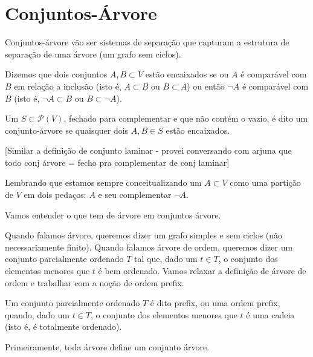 \documentclass[11pt]{article}
\theoremstyle{definition}
\theoremstyle{definition}
\theoremstyle{definition}
\theoremstyle{definition}
\theoremstyle{definition}
\theoremstyle{definition}
\theoremstyle{definition}
\theoremstyle{definition}
\newtheorem*{definition*}{Definição}
\newenvironment{definicao*}{
\definecolor{shadecolor}{HTML}{defcfc}
\begin{shaded}
\begin{definition*}
}
{
\end{definition*}
\end{shaded}
}
\theoremstyle{definition}
\theoremstyle{definition}
\theoremstyle{definition}
\theoremstyle{definition}
\theoremstyle{definition}
\theoremstyle{definition}
\begin{document}
\section{Conjuntos-Árvore}

Conjuntos-árvore vão ser sistemas de separação que capturam a estrutura de separação de uma árvore (um grafo sem ciclos).

\begin{definicao*}
  Dizemos que dois conjuntos $A,B \subset V$ estão encaixados se ou $A$ é comparável com $B$ em relação a inclusão (isto é, $A \subset B$ ou $B \subset A$) ou então $\lnot A$ é comparável com $B$ (isto é, $\lnot A \subset B$ ou $B \subset \lnot A$).

  Um $S \subset \mathcal{P}(V)$, fechado para complementar e que não contém o vazio, é dito um conjunto-árvore se quaisquer dois $A,B \in S$ estão encaixados.
\end{definicao*}

[Similar a definição de conjunto laminar - provei conversando com arjuna que todo conj árvore = fecho pra complementar de conj laminar]

Lembrando que estamos sempre conceitualizando um $A \subset V$ como uma partição de $V$ em dois pedaços: $A$ e seu complementar $\lnot A$.

Vamos entender o que tem de árvore em conjuntos árvore. 

Quando falamos árvore, queremos dizer um grafo simples e sem ciclos (não necessariamente finito). Quando falamos árvore de ordem, queremos dizer um conjunto parcialmente ordenado $T$ tal que, dado um $t \in T$, o conjunto dos elementos menores que $t$ é bem ordenado. Vamos relaxar a definição de árvore de ordem e trabalhar com a noção de ordem prefix.

\begin{definicao*}
  Um conjunto parcialmente ordenado $T$ é dito prefix, ou uma ordem prefix, quando, dado um $t \in T$, o conjunto dos elementos menores que $t$ é uma cadeia (isto é, é totalmente ordenado).
\end{definicao*}

Primeiramente, toda árvore define um conjunto árvore.
\end{document}
